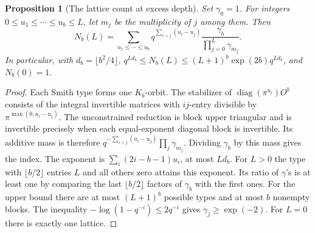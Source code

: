 \documentclass[a4paper,11pt]{article}
\newtheorem{proposition}{Proposition}[section]
\theoremstyle{definition}
\theoremstyle{remark}
\numberwithin{equation}{section}
\begin{document}
\begin{proposition}[The lattice count at excess depth]\label{prop:smindex334}
Set \(\gamma_0=1\). For integers \(0\le u_1\le\cdots\le u_b\le L\),
let \(m_j\) be the multiplicity of \(j\) among them. Then
\[
 N_b(L)=\sum_{u_1\le\cdots\le u_b}
  q^{\sum_{i>j}(u_i-u_j)}\frac{\gamma_b}{\prod_{j=0}^L\gamma_{m_j}}.
\]
In particular, with \(d_b=\lfloor b^2/4\rfloor\),
\(q^{Ld_b}\le N_b(L)\le (L+1)^b\exp(2b)q^{Ld_b}\), and \(N_b(0)=1\).
\end{proposition}
\begin{proof}
Each Smith type forms one \(K_b\)-orbit. The stabilizer of
\(\operatorname{diag}(\pi^{u_i})O^b\) consists of the integral
invertible matrices with \(ij\)-entry divisible by
\(\pi^{\max(0,u_i-u_j)}\). The unconstrained reduction is block upper
triangular and is invertible precisely when each equal-exponent diagonal
block is invertible. Its additive mass is therefore
\(q^{-\sum_{i>j}(u_i-u_j)}\prod_j\gamma_{m_j}\). Dividing \(\gamma_b\)
by this mass gives the index. The exponent is
\(\sum_i(2i-b-1)u_i\), at most \(Ld_b\). For \(L>0\) the type with
\(\lfloor b/2\rfloor\) entries \(L\) and all others zero attains this
exponent. Its ratio of \(\gamma\)'s is at least one by comparing the
last \(\lfloor b/2\rfloor\) factors of \(\gamma_b\) with the first ones.
For the upper bound there are at most \((L+1)^b\) possible types and at
most \(b\) nonempty blocks. The inequality
\(-\log(1-q^{-i})\le2q^{-i}\) gives \(\gamma_j\ge\exp(-2)\).
For \(L=0\) there is exactly one lattice.
\end{proof}
\end{document}

